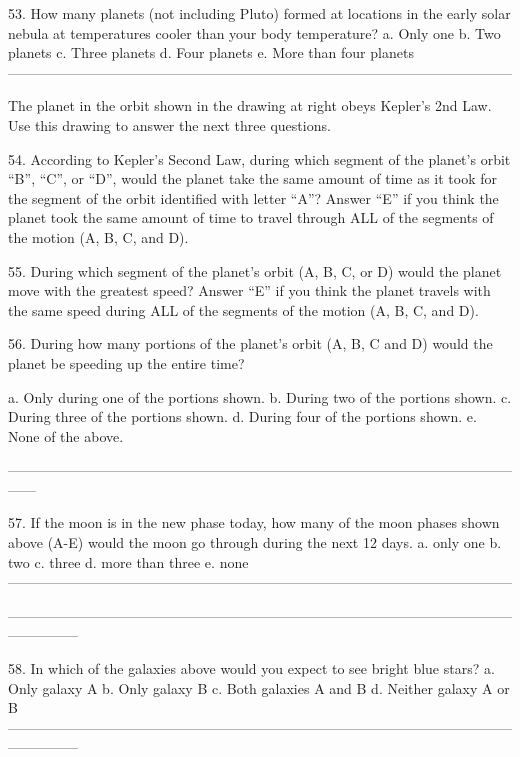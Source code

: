 53. How many planets (not including Pluto) formed at locations in the early solar nebula at temperatures cooler than your body temperature?
a. Only one
b. Two planets
c. Three planets
d. Four planets
e. More than four planets
------------------------------------------------------------------------------------------------------------

The planet in the orbit shown in the drawing at right obeys Kepler’s 2nd Law.  Use this drawing to answer the next three questions.

54. According to Kepler’s Second Law, during which segment of the planet’s orbit “B”, “C”, or “D”, would the planet take the same amount of time as it took for the segment of the orbit identified with letter “A”? Answer “E” if you think the planet took the same amount of time to travel through ALL of the segments of the motion (A, B, C, and D).


55. During which segment of the planet’s orbit (A, B, C, or D) would the planet move with the greatest speed?  Answer “E” if you think the planet travels with the same speed during ALL of the segments of the motion (A, B, C, and D).

56. During how many portions of the planet’s orbit (A, B, C and D) would the planet be speeding up the entire time?

a. Only during one of the portions shown.
b. During two of the portions shown.
c. During three of the portions shown.
d. During four of the portions shown.
e. None of the above.

------------------------------------------------------------------------------------------------------------------


57. If the moon is in the new phase today, how many of the moon phases shown above (A-E) would the moon go through during the next 12 days. 
a. only one
b. two
c. three
d. more than three
e.  none
------------------------------------------------------------------------------------------------------------
 
---------------------------------------------------------------------------------------------------------------------------
















58. In which of the galaxies above would you expect to see bright blue stars? 
a. Only galaxy A
b. Only galaxy B
c. Both galaxies A and B
d. Neither galaxy A or B
---------------------------------------------------------------------------------------------------------------------------


